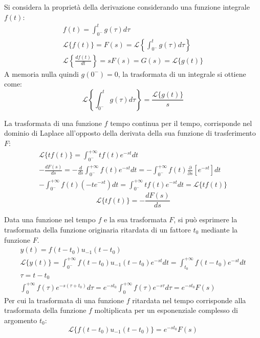 \documentclass{article}
\numberwithin{equation}{subsection}
\begin{document}
Si considera la proprietà della derivazione considerando una funzione integrale $f(t)$:
\begin{gather*}
    f(t)=\displaystyle\int_{0^-}^tg(\tau)d\tau\\
    \mathcal{L}\{f(t)\}=F(s)=\mathcal{L}\left\{\displaystyle\int_{0^-}^tg(\tau)d\tau\right\}\\
    \mathcal{L}\left\{\displaystyle\frac{df(t)}{dt}\right\}=sF(s)=G(s)=\mathcal{L}\{g(t)\}
\end{gather*}
A memoria nulla quindi $g(0^-)=0$, la trasformata di un integrale si ottiene come:
\begin{equation}
    \mathcal{L}\left\{\displaystyle\int_{0^-}^tg(\tau)d\tau\right\}=\frac{\mathcal{L}\{g(t)\}}{s}
\end{equation}



La trasformata di una funzione $f$ tempo continua per il tempo, corrisponde nel dominio di Laplace all'opposto della derivata della sua funzione di 
trasferimento $F$:
\begin{gather*}
    \mathcal{L}\{tf(t)\}=\displaystyle\int_{0^-}^{+\infty}tf(t)e^{-st}dt\\
    \displaystyle-\frac{dF(s)}{ds}=-\frac{d}{ds}\int_{0^-}^{+\infty}f(t)e^{-st}dt=-\int_{0^-}^{+\infty}f(t)\frac{\partial }{\partial s}\left[e^{-st}\right]dt\\
    -\int_{0^-}^{+\infty}f(t)(-te^{-st})dt=\int_{0^-}^{+\infty}tf(t)e^{-st}dt=\mathcal{L}\{tf(t)\}
\end{gather*}
\begin{equation}
    \mathcal{L}\{tf(t)\}=\displaystyle-\frac{dF(s)}{ds}
\end{equation}


Data una funzione nel tempo $f$ e la sua trasformata $F$, si può esprimere la trasformata della funzione originaria ritardata di un fattore $t_0$ mediante 
la funzione $F$. 
\begin{gather*}
    y(t)=f(t-t_0)u_{-1}(t-t_0)\\
    \mathcal{L}\{y(t)\}=\displaystyle\int_{0^-}^{+\infty}f(t-t_0)u_{-1}(t-t_0)e^{-st}dt=\int_{t_0}^{+\infty}f(t-t_0)e^{-st}dt\\
    \tau=t-t_0\\
    \displaystyle\int_{0}^{+\infty}f(\tau)e^{-s(\tau+t_0)}d\tau=e^{-st_0}\int_0^{+\infty}f(\tau)e^{-s\tau}d\tau=e^{-st_0}F(s)
\end{gather*}
Per cui la trasformata di una funzione $f$ ritardata nel tempo corrisponde alla trasformata della funzione $f$ moltiplicata per un esponenziale complesso di argomento $t_0$:
\begin{equation}
    \mathcal{L}\{f(t-t_0)u_{-1}(t-t_0)\}=e^{-st_0}F(s)
\end{equation}
\end{document}
